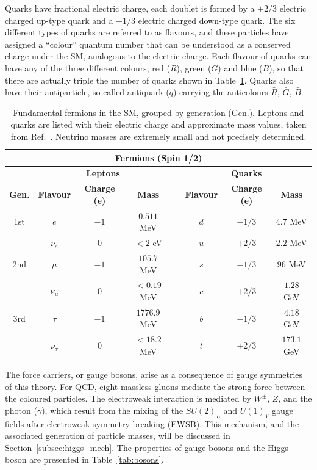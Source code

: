 Quarks have fractional electric charge, each doublet is formed by a $+2/3$ electric charged up-type quark and a $-1/3$ electric charged down-type quark. The six different types of quarks are referred to as flavours, and these particles have assigned a ``colour'' quantum number that can be understood as a conserved charge under the SM, analogous to the electric charge. Each flavour of quarks can have any of the three different colours;
red ($R$), green ($G$) and blue ($B$), so that there are actually triple the number of quarks
shown in Table~\ref{tab:fermions}. Quarks also have their antiparticle, so called antiquark ($\bar{q}$) carrying
the anticolours $\bar{R}$, $\bar{G}$, $\bar{B}$.
\begin{table}[htbp]
\centering
\caption{Fundamental fermions in the SM, grouped by generation (Gen.). Leptons and quarks are listed with their electric charge and approximate mass values, taken from Ref.~\cite{PhysRevD.98.030001}. Neutrino masses are extremely small and not precisely determined.}
\small %
\renewcommand{\arraystretch}{1.2} %
\setlength{\tabcolsep}{4pt} %
\begin{tabular}{cccccccc}
\multicolumn{8}{c}{\textbf{Fermions (Spin 1/2)}} \\
\toprule
 & \multicolumn{3}{c}{\textbf{Leptons}} & & \multicolumn{3}{c}{\textbf{Quarks}} \\
\midrule
\textbf{Gen.} & \textbf{Flavour} & \textbf{Charge (e)} & \textbf{Mass} & 
              & \textbf{Flavour} & \textbf{Charge (e)} & \textbf{Mass} \\
\midrule
1st & $e$ & $-1$ & $0.511$ MeV & & $d$ & $-1/3$ & $4.7$ MeV \\
    & $\nu_e$ & $0$ & $<2$ eV & & $u$ & $+2/3$ & $2.2$ MeV \\
2nd & $\mu$ & $-1$ & $105.7$ MeV & & $s$ & $-1/3$ & $96$ MeV \\
     & $\nu_\mu$ & $0$ & $<0.19$ MeV & & $c$ & $+2/3$ & $1.28$ GeV \\
3rd & $\tau$ & $-1$ & $1776.9$ MeV & & $b$ & $-1/3$ & $4.18$ GeV \\
     & $\nu_\tau$ & $0$ & $<18.2$ MeV & & $t$ & $+2/3$ & $173.1$ GeV \\
\bottomrule
\end{tabular}
\label{tab:fermions}
\end{table}
The force carriers, or gauge bosons, arise as a consequence of gauge symmetries of this theory. For QCD, eight massless gluons mediate the strong force between the coloured particles. The electroweak interaction is mediated by $W^\pm$, $Z$, and the photon ($\gamma$), which result from the mixing of the $SU(2)_L$ and $U(1)_Y$ gauge fields after electroweak symmetry breaking (EWSB). This mechanism, and the associated generation of particle masses, will be discussed in Section~\ref{subsec:higgs_mech}. The properties of gauge bosons and the Higgs boson are presented in Table~\ref{tab:bosons}.

